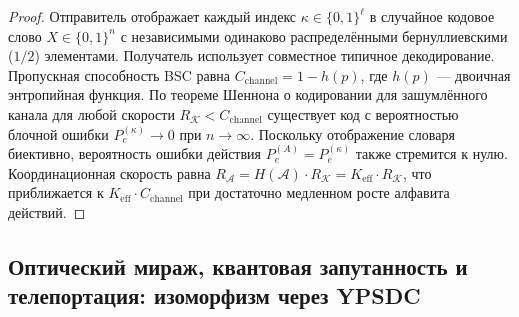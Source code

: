 \documentclass[12pt,a4paper]{article}
\theoremstyle{remark}
\begin{document}
	\begin{proof}
		Отправитель отображает каждый индекс \(\kappa \in \{0,1\}^\ell\) в случайное кодовое слово \(X \in \{0,1\}^n\) с независимыми одинаково распределёнными бернуллиевскими (\(1/2\)) элементами. Получатель использует совместное типичное декодирование. Пропускная способность BSC равна \(C_{\mathrm{channel}} = 1 - h(p)\), где \(h(p)\) — двоичная энтропийная функция. По теореме Шеннона о кодировании для зашумлённого канала для любой скорости \(R_{\mathcal{K}} < C_{\mathrm{channel}}\) существует код с вероятностью блочной ошибки \(P_e^{(\kappa)} \to 0\) при \(n \to \infty\). Поскольку отображение словаря биективно, вероятность ошибки действия \(P_e^{(A)} = P_e^{(\kappa)}\) также стремится к нулю. Координационная скорость равна \(R_{\mathcal{A}} = H(\mathcal{A}) \cdot R_{\mathcal{K}} = K_{\mathrm{eff}} \cdot R_{\mathcal{K}}\), что приближается к \(K_{\mathrm{eff}} \cdot C_{\mathrm{channel}}\) при достаточно медленном росте алфавита действий.
	\end{proof}
	
	\subsection{Оптический мираж, квантовая запутанность и телепортация: изоморфизм через YPSDC}
	\label{subsec:mirage-ypsdc}
	
\end{document}
